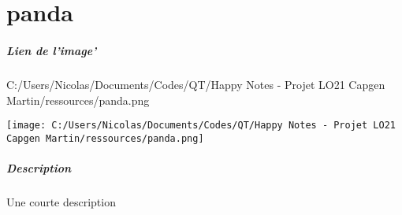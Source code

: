 \documentclass[a4paper,11pt]{report}
\begin{document}
\chapter{panda}
\paragraph{Lien de l'image'}C:/Users/Nicolas/Documents/Codes/QT/Happy Notes - Projet LO21 Capgen Martin/ressources/panda.png
\begin{center}
\texttt{[image: C:/Users/Nicolas/Documents/Codes/QT/Happy Notes - Projet LO21 Capgen Martin/ressources/panda.png]}
\end{center}
\paragraph{Description}Une courte description
\end{document}
